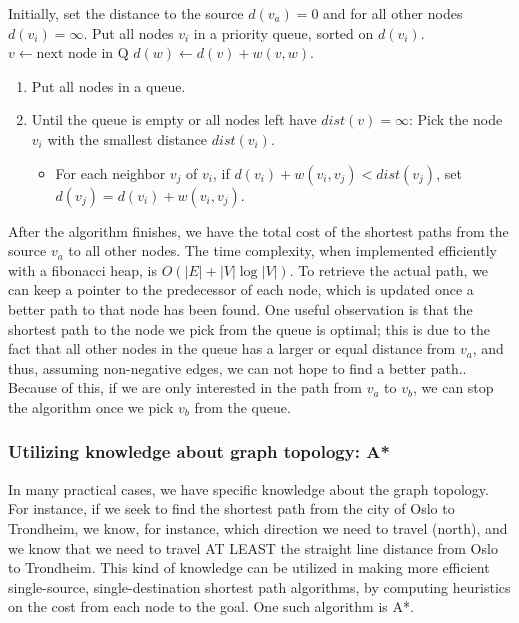 \begin{algorithm}
\begin{algorithmic}
\STATE Initially, set the distance to the source $d(v_a)=0$ and for all other nodes $d(v_i) = \infty$.
\STATE Put all nodes $v_i$ in a priority queue, sorted on $d(v_i)$.
    \STATE $v \gets \mbox{next node in Q}$
            \STATE $d(w) \gets  d(v)+w(v, w)$.
        \ENDIF
    \ENDFOR
\ENDWHILE
\end{algorithmic}
\begin{enumerate}
\item Put all nodes in a queue.
\item Until the queue is empty or all nodes left have $dist(v)=\infty$: Pick the node $v_i$ with the smallest distance $dist(v_i)$. 
\begin{itemize}
\item For each neighbor $v_j$ of $v_i$, if $d(v_i)+w(v_i,v_j) < dist(v_j)$, set $d(v_j)=d(v_i)+w(v_i, v_j)$.
\end{itemize}
\end{enumerate}
\end{algorithm}

After the algorithm finishes, we have the total cost of the shortest paths from the source $v_a$ to all other nodes. The time complexity, when implemented efficiently with a fibonacci heap, is $O(|E|+|V|\log |V|)$\cite{fibodijkstra}. To retrieve the actual path, we can keep a pointer to the predecessor of each node, which is updated once a better path to that node has been found. One useful observation is that the shortest path to the node we pick from the queue is optimal; this is due to the fact that all other nodes in the queue has a larger or equal distance from $v_a$, and thus, assuming non-negative edges, we can not hope to find a better path.. Because of this, if we are only interested in the path from $v_a$ to $v_b$, we can stop the algorithm once we pick $v_b$ from the queue. 

\subsubsection{Utilizing knowledge about graph topology: A*}
In many practical cases, we have specific knowledge about the graph topology. For instance, if we seek to find the shortest path from the city of Oslo to Trondheim, we know, for instance, which direction we need to travel (north), and we know that we need to travel AT LEAST the straight line distance from Oslo to Trondheim. This kind of knowledge can be utilized in making more efficient single-source, single-destination shortest path algorithms, by computing heuristics on the cost from each node to the goal. One such algorithm is A*.

